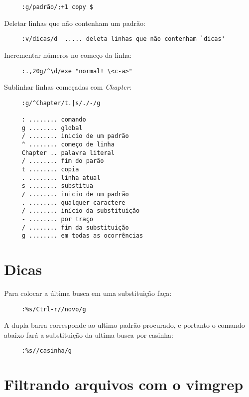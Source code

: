 \begin{verbatim}
     :g/padrão/;+1 copy $
\end{verbatim}

Deletar linhas que não contenham um padrão:

\begin{verbatim}
     :v/dicas/d  ..... deleta linhas que não contenham `dicas'
\end{verbatim}

Incrementar números no começo da linha:

\begin{verbatim}
     :.,20g/^\d/exe "normal! \<c-a>"
\end{verbatim}

Sublinhar linhas começadas com {\em Chapter}:

\begin{verbatim}
     :g/^Chapter/t.|s/./-/g

     : ........ comando
     g ........ global
     / ........ inicio de um padrão
     ^ ........ começo de linha
     Chapter .. palavra literal
     / ........ fim do parão
     t ........ copia
     . ........ linha atual
     s ........ substitua
     / ........ inicio de um padrão
     . ........ qualquer caractere
     / ........ início da substituição
     - ........ por traço
     / ........ fim da substituição
     g ........ em todas as ocorrências
\end{verbatim}

\section{Dicas }
Para colocar a última busca em uma substituição faça:

\begin{verbatim}
     :%s/Ctrl-r//novo/g
\end{verbatim}

A dupla barra corresponde ao ultimo padrão procurado, e portanto o
comando abaixo fará a substituição da ultima busca por casinha:

\begin{verbatim}
     :%s//casinha/g
\end{verbatim}

\section{Filtrando arquivos com o vimgrep}
\label{Filtrando arquivos com o vimgrep}

